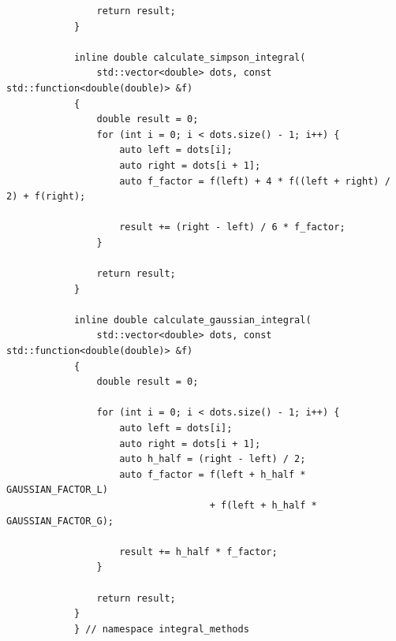 \documentclass[a4paper, 14pt]{extarticle}
\begin{document}
{\begin{verbatim}
                return result;
            }

            inline double calculate_simpson_integral(
                std::vector<double> dots, const std::function<double(double)> &f)
            {
                double result = 0;
                for (int i = 0; i < dots.size() - 1; i++) {
                    auto left = dots[i];
                    auto right = dots[i + 1];
                    auto f_factor = f(left) + 4 * f((left + right) / 2) + f(right);

                    result += (right - left) / 6 * f_factor;
                }

                return result;
            }

            inline double calculate_gaussian_integral(
                std::vector<double> dots, const std::function<double(double)> &f)
            {
                double result = 0;

                for (int i = 0; i < dots.size() - 1; i++) {
                    auto left = dots[i];
                    auto right = dots[i + 1];
                    auto h_half = (right - left) / 2;
                    auto f_factor = f(left + h_half * GAUSSIAN_FACTOR_L)
                                    + f(left + h_half * GAUSSIAN_FACTOR_G);

                    result += h_half * f_factor;
                }

                return result;
            }
            } // namespace integral_methods
        \end{verbatim}
    }\label{sec:-3}
\end{document}
